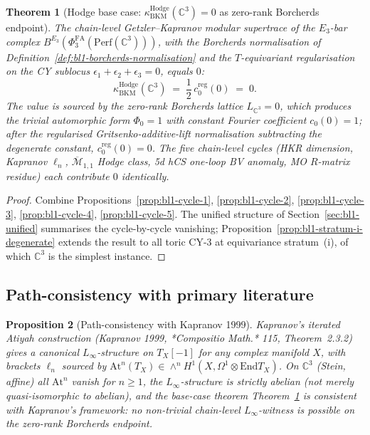 \documentclass[11pt]{article}
\newtheorem{theorem}{Theorem}[section]
\newtheorem{proposition}[theorem]{Proposition}
\providecommand{\End}{\mathrm{End}}
\providecommand{\Perf}{\mathrm{Perf}}
\providecommand{\C}{\mathbb{C}}
\providecommand{\kBKM}{\kappa_{\mathrm{BKM}}}
\providecommand{\Mbar}{\overline{\mathcal M}}
\providecommand{\PhiFA}{\Phi^{\mathrm{FA}}}
\begin{document}
\begin{theorem}[Hodge base case: $\kBKM^{\mathrm{Hodge}}(\C^3) = 0$ as
zero-rank Borcherds endpoint]
\label{thm:bl1-hodge-c3-base-case}
The chain-level Getzler--Kapranov modular supertrace of the
$E_3$-bar complex $B^{E_3}(\PhiFA_3(\Perf(\C^3)))$, with the
Borcherds normalisation of
Definition~\ref{def:bl1-borcherds-normalisation} and the $T$-equivariant
regularisation on the CY sublocus
$\epsilon_1 + \epsilon_2 + \epsilon_3 = 0$, equals $0$:
\begin{equation}
\label{eq:bl1-final-identity}
  \kBKM^{\mathrm{Hodge}}(\C^3)
  \;=\;
  \frac{1}{2}\, c_0^{\mathrm{reg}}(0)
  \;=\;
  0.
\end{equation}
The value is sourced by the zero-rank Borcherds lattice $L_{\C^3} = 0$,
which produces the trivial automorphic form $\Phi_0 = 1$ with
constant Fourier coefficient $c_0(0) = 1$; after the regularised
Gritsenko-additive-lift normalisation subtracting the degenerate
constant, $c_0^{\mathrm{reg}}(0) = 0$. The five chain-level cycles
(HKR dimension, Kapranov $\ell_n$, $\Mbar_{1,1}$ Hodge class, 5d hCS
one-loop BV anomaly, MO $R$-matrix residue) each contribute $0$
identically.
\end{theorem}

\begin{proof}
Combine Propositions~\ref{prop:bl1-cycle-1}, \ref{prop:bl1-cycle-2},
\ref{prop:bl1-cycle-3}, \ref{prop:bl1-cycle-4},
\ref{prop:bl1-cycle-5}. The unified structure of
Section~\ref{sec:bl1-unified} summarises the cycle-by-cycle vanishing;
Proposition~\ref{prop:bl1-stratum-i-degenerate} extends the result to
all toric CY-$3$ at equivariance stratum~(i), of which $\C^3$ is the
simplest instance.
\end{proof}

\subsection{Path-consistency with primary literature}
\label{subsec:bl1-path-consistency}

\begin{proposition}[Path-consistency with Kapranov 1999]
\label{prop:bl1-kapranov-consistency}
Kapranov's iterated Atiyah construction (Kapranov 1999, *Compositio
Math.* 115, Theorem~2.3.2) gives a canonical $L_\infty$-structure on
$T_X[-1]$ for any complex manifold $X$, with brackets $\ell_n$ sourced
by $\mathrm{At}^n(T_X) \in \wedge^n H^1(X, \Omega^1 \otimes \End T_X)$.
On $\C^3$ (Stein, affine) all $\mathrm{At}^n$ vanish for $n \geq 1$,
the $L_\infty$-structure is strictly abelian (not merely quasi-isomorphic
to abelian), and the base-case theorem Theorem~\ref{thm:bl1-hodge-c3-base-case}
is consistent with Kapranov's framework: no non-trivial chain-level
$L_\infty$-witness is possible on the zero-rank Borcherds endpoint.
\end{proposition}
\end{document}
